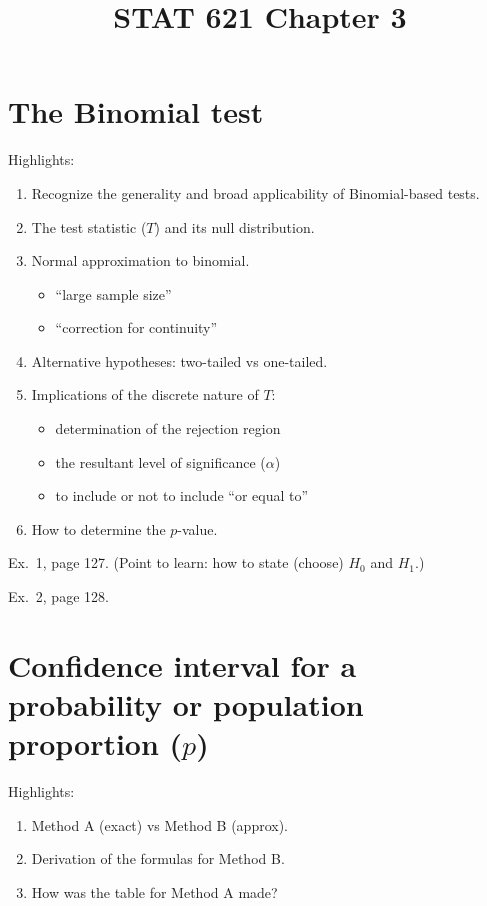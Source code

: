 \documentclass[12pt]{article}
\begin{document}
\title{STAT 621 Chapter 3}
\maketitle

\section{The Binomial test}

Highlights:
\begin{enumerate}
\item Recognize the generality and broad applicability of Binomial-based
tests.
\item The test statistic ($T$) and its null distribution.
\item Normal approximation to binomial.
    \begin{itemize}
    \item ``large sample size''
    \item ``correction for continuity''
    \end{itemize}
\item Alternative hypotheses: two-tailed vs one-tailed.
\item Implications of the discrete nature of $T$:
    \begin{itemize}
    \item determination of the rejection region
    \item the resultant level of significance ($\alpha$)
    \item to include or not to include ``or equal to''
    \end{itemize}
\item How to determine the $p$-value.
\end{enumerate}

\example Ex.~1, page 127. (Point to learn: how to state (choose) $H_0$
and $H_1$.)

\example Ex.~2, page 128.

\section{Confidence interval for a probability or population proportion
($p$)}

Highlights:

\begin{enumerate}
\item Method A (exact) vs Method B (approx).
\item Derivation of the formulas for Method B.
\item How was the table for Method A made?
\end{enumerate}
\end{document}
